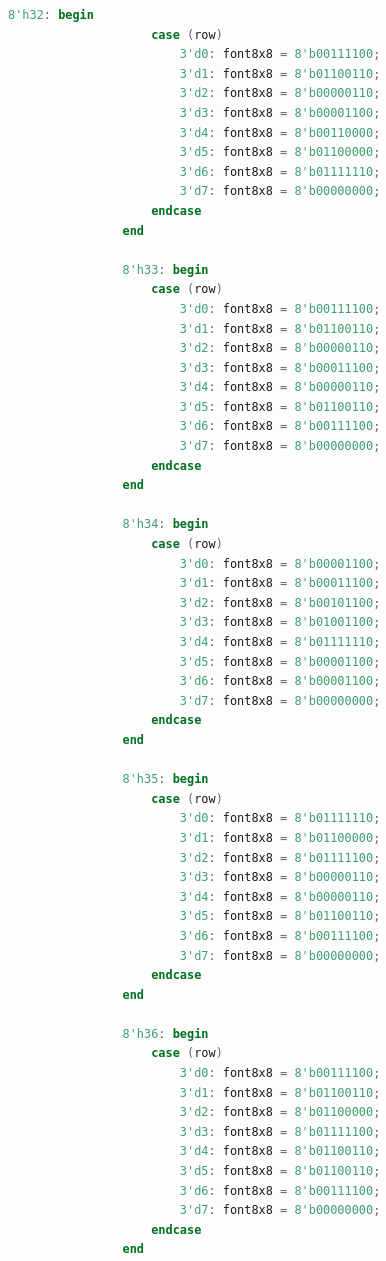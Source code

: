 \begin{lstlisting}[language=Verilog, title={Kode untuk menampilkan data hasil vga ke monitor}, label={code:vga-rgb-565}]
                8'h32: begin
                    case (row)
                        3'd0: font8x8 = 8'b00111100;
                        3'd1: font8x8 = 8'b01100110;
                        3'd2: font8x8 = 8'b00000110;
                        3'd3: font8x8 = 8'b00001100;
                        3'd4: font8x8 = 8'b00110000;
                        3'd5: font8x8 = 8'b01100000;
                        3'd6: font8x8 = 8'b01111110;
                        3'd7: font8x8 = 8'b00000000;
                    endcase
                end

                8'h33: begin
                    case (row)
                        3'd0: font8x8 = 8'b00111100;
                        3'd1: font8x8 = 8'b01100110;
                        3'd2: font8x8 = 8'b00000110;
                        3'd3: font8x8 = 8'b00011100;
                        3'd4: font8x8 = 8'b00000110;
                        3'd5: font8x8 = 8'b01100110;
                        3'd6: font8x8 = 8'b00111100;
                        3'd7: font8x8 = 8'b00000000;
                    endcase
                end

                8'h34: begin
                    case (row)
                        3'd0: font8x8 = 8'b00001100;
                        3'd1: font8x8 = 8'b00011100;
                        3'd2: font8x8 = 8'b00101100;
                        3'd3: font8x8 = 8'b01001100;
                        3'd4: font8x8 = 8'b01111110;
                        3'd5: font8x8 = 8'b00001100;
                        3'd6: font8x8 = 8'b00001100;
                        3'd7: font8x8 = 8'b00000000;
                    endcase
                end

                8'h35: begin
                    case (row)
                        3'd0: font8x8 = 8'b01111110;
                        3'd1: font8x8 = 8'b01100000;
                        3'd2: font8x8 = 8'b01111100;
                        3'd3: font8x8 = 8'b00000110;
                        3'd4: font8x8 = 8'b00000110;
                        3'd5: font8x8 = 8'b01100110;
                        3'd6: font8x8 = 8'b00111100;
                        3'd7: font8x8 = 8'b00000000;
                    endcase
                end

                8'h36: begin
                    case (row)
                        3'd0: font8x8 = 8'b00111100;
                        3'd1: font8x8 = 8'b01100110;
                        3'd2: font8x8 = 8'b01100000;
                        3'd3: font8x8 = 8'b01111100;
                        3'd4: font8x8 = 8'b01100110;
                        3'd5: font8x8 = 8'b01100110;
                        3'd6: font8x8 = 8'b00111100;
                        3'd7: font8x8 = 8'b00000000;
                    endcase
                end


\end{lstlisting}

